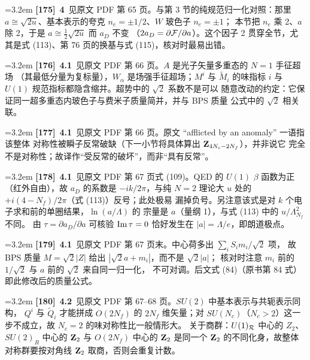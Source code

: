 \par
\par\medskip\noindent\hangindent=3.2em \textbf{[175]}~\textbf{4}~见原文 PDF 第 65 页。与第 3 节的纯规范归一化对照：那里 $a\cong\sqrt{2u}$、基本表示的夸克 $n_e=\pm1/2$、$W$ 玻色子 $n_e=\pm1$； 本节把 $n_e$ 乘 2、$a$ 除 2，于是 $a\cong\frac12\sqrt{2u}$ 而 $a_D$ 不变 （$2a_D=\partial{\cal F}/\partial a$）。这个因子 2 贯穿全节，尤其是式 (113)、第 76 页的换基与式 (115)，核对时最易出错。
\par
\par\medskip\noindent\hangindent=3.2em \textbf{[176]}~\textbf{4.1}~见原文 PDF 第 66 页。$A$ 是光子矢量多重态的 $N=1$ 手征超场 （其最低分量为复标量），$W_\alpha$ 是场强手征超场；$M^i$ 与 $\widetilde M_i$ 的味指标 $i$ 与 $U(1)$ 规范指标都隐含缩并。超势中的 $\sqrt2$ 系数不是可以 随意改动的约定：它保证同一超多重态内玻色子与费米子质量简并，并与 BPS 质量 公式中的 $\sqrt2$ 相关联。
\par
\par\medskip\noindent\hangindent=3.2em \textbf{[177]}~\textbf{4.1}~见原文 PDF 第 66 页。原文 “afflicted by an anomaly” 一语指该整体 对称性被瞬子反常破缺（下一小节将具体算出 ${\bf Z}_{4N_c-2N_f}$），并非说它 完全不是对称性；故译作“受反常的破坏”，而非“具有反常”。
\par
\par\medskip\noindent\hangindent=3.2em \textbf{[178]}~\textbf{4.1}~见原文 PDF 第 67 页式 (109)。QED 的 $U(1)$ $\beta$ 函数为正（红外自由），故 $a_D$ 的系数是 $-ik/2\pi$，与纯 $N=2$ 理论大 $u$ 处的 $+i(4-N_f)/2\pi$（式 (113)）反号；此处极易 漏掉负号。另注意该式是对 $k$ 个电子求和前的单圈结果，$\ln(a/\Lambda)$ 的 宗量是 $a$（量纲 1），与式 (113) 中的 $u/\Lambda^2_{N_f}$ 不同。 由 $\tau=\partial a_D/\partial a$ 可核验 ${\rm Im}\,\tau=0$ 恰好发生在 $|a|=\Lambda/e$，即朗道极点。
\par
\par\medskip\noindent\hangindent=3.2em \textbf{[179]}~\textbf{4.1}~见原文 PDF 第 67 页末。中心荷多出 $\sum_iS_im_i/\sqrt2$ 项， 故 BPS 质量 $M=\sqrt2|Z|$ 给出 $|\sqrt2a+m_i|$，而不是 $\sqrt2|a|$； 核对时注意 $m_i$ 前的 $1/\sqrt2$ 与 $a$ 前的 $\sqrt2$ 来自同一归一化， 不可对调。后文式 (84)（原书第 84 式）即此修改后的质量公式。
\par
\par\medskip\noindent\hangindent=3.2em \textbf{[180]}~\textbf{4.2}~见原文 PDF 第 67--68 页。$SU(2)$ 中基本表示与共轭表示同构， $Q^i$ 与 $\widetilde Q_i$ 才能拼成 $O(2N_f)$ 的 $2N_f$ 维矢量；对 $SU(N_c)$（$N_c>2$）这一步不成立，故 $N_c=2$ 的味对称性比一般情形大。 关于商群：$U(1)_{\cal R}$ 中心的 $Z_2$、$SU(2)_R$ 中心的 ${\bf Z}_2$ 与 $O(2N_f)$ 中心的 ${\bf Z}_2$ 是同一个 ${\bf Z}_2$ 的不同化身，故整体 对称群要按对角线 ${\bf Z}_2$ 取商，否则会重复计数。
